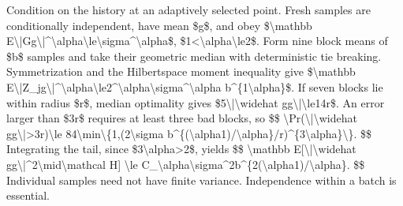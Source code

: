 \documentclass[10pt,a4paper]{article}
\begin{document}
Condition on the history at an adaptively selected point. Fresh samples are conditionally independent, have mean \$g\$, and obey
\$\textbackslash{}mathbb E\textbackslash{}|Gg\textbackslash{}|\textasciicircum{}\textbackslash{}alpha\textbackslash{}le\textbackslash{}sigma\textasciicircum{}\textbackslash{}alpha\$, \$1<\textbackslash{}alpha\textbackslash{}le2\$.
Form nine block means of \$b\$ samples and take their geometric median with deterministic tie breaking. Symmetrization and the Hilbertspace moment inequality give
\$\textbackslash{}mathbb E\textbackslash{}|Z\_jg\textbackslash{}|\textasciicircum{}\textbackslash{}alpha\textbackslash{}le2\textasciicircum{}\textbackslash{}a\allowbreak{}lpha\textbackslash{}sigma\textasciicircum{}\textbackslash{}alpha b\textasciicircum{}\{1\textbackslash{}alpha\}\$.
If seven blocks lie within radius \$r\$, median optimality gives
\$5\textbackslash{}|\textbackslash{}widehat gg\textbackslash{}|\textbackslash{}le14r\$.
An error larger than \$3r\$ requires at least three bad blocks, so
\$\$
\textbackslash{}Pr(\textbackslash{}|\textbackslash{}widehat gg\textbackslash{}|>3r)\textbackslash{}le
84\textbackslash{}min\textbackslash{}\{1,(2\textbackslash{}sigma b\textasciicircum{}\{(\textbackslash{}alpha1)/\textbackslash{}alpha\}/r)\textasciicircum{}\{3\textbackslash{}alpha\}\textbackslash{}\}.
\$\$
Integrating the tail, since \$3\textbackslash{}alpha>2\$, yields
\$\$
\textbackslash{}mathbb E[\textbackslash{}|\textbackslash{}widehat gg\textbackslash{}|\textasciicircum{}2\textbackslash{}mid\textbackslash{}mathcal H]
\textbackslash{}le C\_\textbackslash{}alpha\textbackslash{}sigma\textasciicircum{}2b\textasciicircum{}\{2(\textbackslash{}a\allowbreak{}lpha1)/\textbackslash{}alpha\}.
\$\$
Individual samples need not have finite variance. Independence within a batch is essential.
\end{document}
